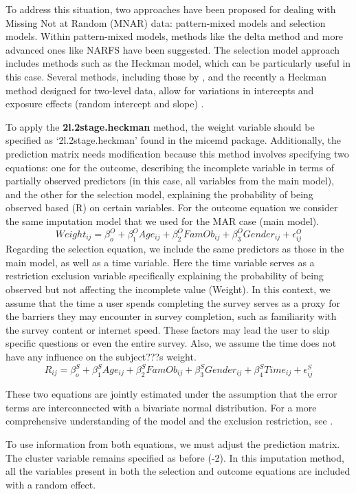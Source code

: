 \documentclass[
  article]{jss}
\begin{document}
To address this situation, two approaches have been proposed for dealing
with Missing Not at Random (MNAR) data: pattern-mixed models and
selection models. Within pattern-mixed models, methods like the delta
method and more advanced ones like NARFS have been suggested. The
selection model approach includes methods such as the Heckman model,
which can be particularly useful in this case. Several methods,
including those by \cite{galimard2018}, and the recently a Heckman
method designed for two-level data, allow for variations in intercepts
and exposure effects (random intercept and slope) \cite{munoz2023}.

To apply the \textbf{2l.2stage.heckman} method, the weight variable
should be specified as `2l.2stage.heckman' found in the micemd package.
Additionally, the prediction matrix needs modification because this
method involves specifying two equations: one for the outcome,
describing the incomplete variable in terms of partially observed
predictors (in this case, all variables from the main model), and the
other for the selection model, explaining the probability of being
observed based (R) on certain variables. For the outcome equation we
consider the same imputation model that we used for the MAR case (main
model).
\[Weight_{ij}= \beta^O_{o} + \beta^O_{1}Age_{ij} + \beta^O_{2}FamOb_{ij}+ \beta^O_{3}Gender_{ij} + \epsilon^O_{ij}\]
Regarding the selection equation, we include the same predictors as
those in the main model, as well as a time variable. Here the time
variable serves as a restriction exclusion variable specifically
explaining the probability of being observed but not affecting the
incomplete value (Weight). In this context, we assume that the time a
user spends completing the survey serves as a proxy for the barriers
they may encounter in survey completion, such as familiarity with the
survey content or internet speed. These factors may lead the user to
skip specific questions or even the entire survey. Also, we assume the
time does not have any influence on the subject???s weight.
\[R_{ij}= \beta^S_{o} + \beta^S_{1}Age_{ij} + \beta^S_{2}FamOb_{ij}+ \beta^S_{3}Gender_{ij} +\beta^S_{4}Time_{ij}+ \epsilon^S_{ij}\]

These two equations are jointly estimated under the assumption that the
error terms are interconnected with a bivariate normal distribution. For
a more comprehensive understanding of the model and the exclusion
restriction, see \cite{munoz2023a}.

To use information from both equations, we must adjust the prediction
matrix. The cluster variable remains specified as before (-2). In this
imputation method, all the variables present in both the selection and
outcome equations are included with a random effect.
\end{document}
